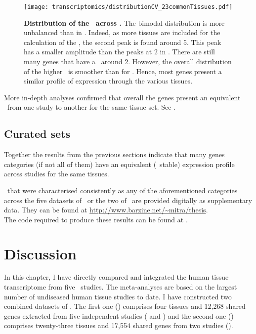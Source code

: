 \begin{figure}[!htbp]
    \texttt{[image: transcriptomics/distributionCV\_23commonTissues.pdf]}\centering
    \vspace{-4mm}
    \caption[Coefficients of variation across \setTwo\ 2 studies and their set
    of common genes across the 23 tissues]{\label{fig:HistCV23T}\textbf{Distribution
    of the \cvs\ across \setTwo.}
    The bimodal distribution is more unbalanced than in .
    Indeed, as more tissues are included for the calculation of the \cvs,
    the second peak is found around $5$.
    This peak has a smaller amplitude than the peaks at $2$ in .
    There are still many genes that have a \cv\ around $2$.
    However, the overall distribution of the higher \cvs\ is smoother than
    for \setOne.
    Hence, most genes present a similar profile of expression through the various
    tissues.}
\end{figure}

More in-depth analyses confirmed that
overall the genes present an equivalent \cv\
from one study to another
for the same tissue set. See .\mybr\

\subsection{Curated sets}\label{subsec:Trans_curatedSets}

Together the results from the previous sections indicate that
many genes categories (if not all of them) have
an equivalent (\ie\ stable) expression profile
across studies for the same tissues.

\Pcgs\ that were characterised consistently
as any of the aforementioned categories across the five datasets of \setOne\
or the two of \setTwo\
are provided digitally as supplementary data.
They can be found at \url{http://www.barzine.net/~mitra/thesis}.
\\The code required to produce these results can be found at \github.\mybr\

\section{Discussion}\label{sec:Trans_discussion}
In this chapter,
I have directly compared and integrated
the human tissue transcriptome from five \Rnaseq\ studies.
The meta-analyses are based on the largest number
of undiseased human tissue studies to date.
I have constructed two combined datasets of \pcgs.
The first one (\setOne) comprises four tissues
and 12,268 shared genes
extracted from five independent studies
(\cite{Krupp2012,VTpaper,Uhlen2015,GTExTranscript} and \ibm)
and the second one (\setTwo) comprises twenty-three tissues
and 17,554 shared genes
from two studies (\cite{Uhlen2015,GTExTranscript}).\mybr\

